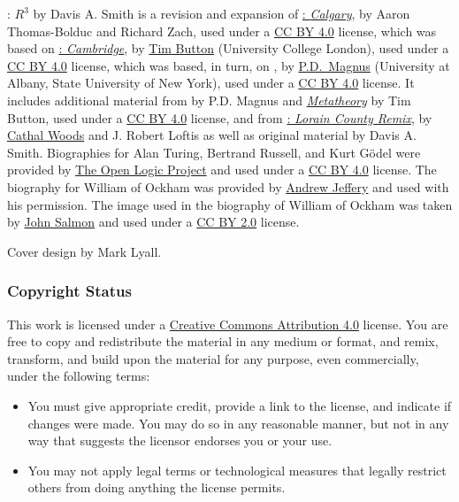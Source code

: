 \noindent\small%
\forallx: \emph{$R^3$} by Davis A. Smith is a revision and expansion of \href{https://forallx.openlogicproject.org/}{\forallx: \emph{Calgary}}, 
by Aaron Thomas-Bolduc and Richard Zach, used under a 
\href{https://creativecommons.org/licenses/by/4.0/}{CC BY 4.0} license, which was based on
\href{https://www.homepages.ucl.ac.uk/~uctytbu/OERs.html}{\forallx:
\emph{Cambridge}}, by 
\href{https://www.homepages.ucl.ac.uk/~uctytbu/}{Tim Button} (University College London), 
used under a \href{https://creativecommons.org/licenses/by/4.0/}{CC BY
4.0} license, which was based, in turn,
on \href{https://www.fecundity.com/logic/}{\forallx}, by
\href{https://www.fecundity.com/job/}{P.D.\ Magnus} 
(University at Albany, State University of New York),
used under a \href{https://creativecommons.org/licenses/by/4.0/}{CC BY
4.0} license.
It includes additional material from \forallx{} by P.D. Magnus and
\href{https://www.homepages.ucl.ac.uk/~uctytbu/OERs.html}{\emph{Metatheory}} by Tim Button, 
used under a \href{https://creativecommons.org/licenses/by/4.0/}{CC BY
4.0} license, and 
from \href{https://github.com/rob-helpy-chalk/openintroduction}{\forallx: \emph{Lorain
County Remix}},
by \href{https://sites.google.com/site/cathalwoods/}{Cathal Woods} and
J. Robert Loftis as well as original material by Davis A. Smith. Biographies for Alan Turing, Bertrand Russell, and Kurt G\"{o}del were provided by \href{https://builds.openlogicproject.org/}{The Open Logic Project} and used under a \href{https://creativecommons.org/licenses/by/4.0/}{CC BY 4.0} license. The biography for William of Ockham was provided by \href{https://sites.google.com/view/andrewjefferyswebpage}{Andrew Jeffery} and used with his permission. The image used in the biography of William of Ockham was taken by \href{https://www.geograph.org.uk/profile/9419}{John Salmon} and used under a \href{https://creativecommons.org/licenses/by-sa/2.0/}{CC BY 2.0} license. 

\noindent Cover design by Mark Lyall.

\bigskip
\subsubsection{Copyright Status}

This work is licensed under a \href{https://creativecommons.org/licenses/by/4.0/}{Creative Commons Attribution 4.0} license.
You are free to copy and redistribute the material in any medium or format, and  remix, transform, and build upon the material for any purpose, even commercially, under the following terms:
\begin{itemize}
\item You must give appropriate credit, provide a link to the license, and indicate if changes were made. You may do so in any reasonable manner, but not in any way that suggests the licensor endorses you or your use.
\item You may not apply legal terms or technological measures that legally restrict others from doing anything the license permits.
\end{itemize}

